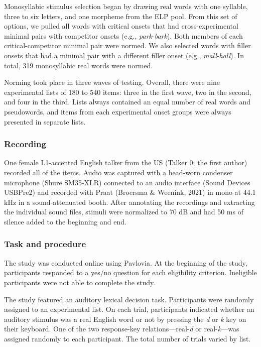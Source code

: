 \documentclass[
  12pt,
  twoside]{article}
\begin{document}
Monosyllabic stimulus selection began by drawing real words with one syllable, three to six letters, and one morpheme from the ELP pool.
From this set of options, we pulled all words with critical onsets that had cross-experimental minimal pairs with competitor onsets (e.g., \emph{park}-\emph{bark}).
Both members of each critical-competitor minimal pair were normed.
We also selected words with filler onsets that had a minimal pair with a different filler onset (e.g., \emph{mall}-\emph{hall}).
In total, 319 monosyllabic real words were normed.

Norming took place in three waves of testing.
Overall, there were nine experimental lists of 180 to 540 items: three in the first wave, two in the second, and four in the third.
Lists always contained an equal number of real words and pseudowords, and items from each experimental onset groups were always presented in separate lists.

\hypertarget{methods-rec}{%
\subsubsection{Recording}\label{methods-rec}}

One female L1-accented English talker from the US (Talker 0; the first author) recorded all of the items.
Audio was captured with a head-worn condenser microphone (Shure SM35-XLR) connected to an audio interface (Sound Devices USBPre2) and recorded with Praat (Broersma \& Weenink, 2021) in mono at 44.1 kHz in a sound-attenuated booth.
After annotating the recordings and extracting the individual sound files, stimuli were normalized to 70 dB and had 50 ms of silence added to the beginning and end.

\hypertarget{task-and-procedure}{%
\subsubsection{Task and procedure}\label{task-and-procedure}}

The study was conducted online using Pavlovia.
At the beginning of the study, participants responded to a yes/no question for each eligibility criterion.
Ineligible participants were not able to complete the study.

The study featured an auditory lexical decision task.
Participants were randomly assigned to an experimental list.
On each trial, participants indicated whether an auditory stimulus was a real English word or not by pressing the \emph{d} or \emph{k} key on their keyboard.
One of the two response-key relations---real-\emph{d} or real-\emph{k}---was assigned randomly to each participant.
The total number of trials varied by list.
\end{document}
